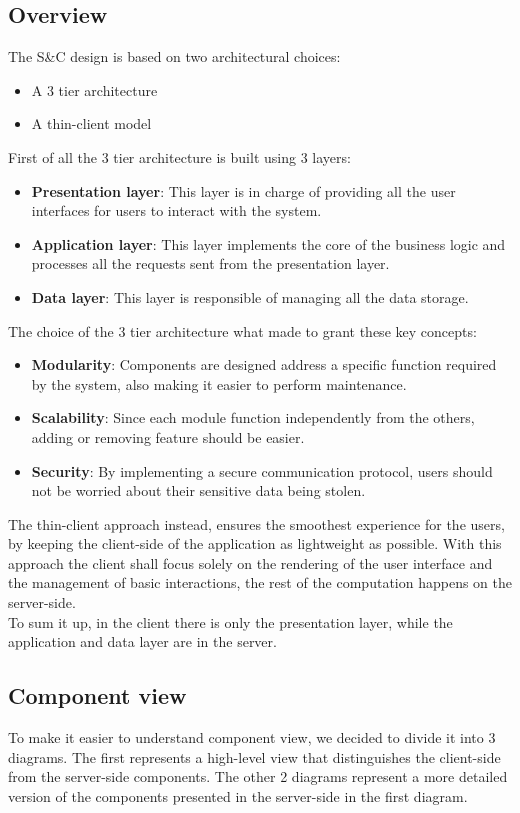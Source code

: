 \documentclass[11pt,twoside]{article}
\begin{document}
	\subsection{Overview}	
The S\&C design is based on two architectural choices:
\begin{itemize}
\item A 3 tier architecture
\item A thin-client model
\end{itemize}
First of all the 3 tier architecture is built using 3 layers:
\begin{itemize}
\item \textbf{Presentation layer}: This layer is in charge of providing all the user interfaces for users to interact with the system.
\item \textbf{Application layer}: This layer implements the core of the business logic and processes all the requests sent from the presentation layer.
\item \textbf{Data layer}: This layer is responsible of managing all the data storage.
\end{itemize}
The choice of the 3 tier architecture what made to grant these key concepts:
\begin{itemize}
\item \textbf{Modularity}: Components are designed address a specific function required by the system, also making it easier to perform maintenance.
\item \textbf{Scalability}: Since each module function independently from the others, adding or removing feature should be easier.
\item \textbf{Security}: By implementing a secure communication protocol, users should not be worried about their sensitive data being stolen.
\end{itemize}
The thin-client approach instead, ensures the smoothest experience for the users, by keeping the client-side of the application as lightweight as possible. With this approach the client shall focus solely on the rendering of the user interface and the management of basic interactions, the rest of the computation happens on the server-side.\\
To sum it up, in the client there is only the presentation layer, while the application and data layer are in the server.

	\subsection{Component view}
To make it easier to understand component view, we decided to divide it into 3 diagrams. The first represents a high-level view that distinguishes the client-side from the server-side components. The other 2 diagrams represent a more detailed version of the components presented in the server-side in the first diagram.
\end{document}
